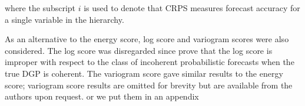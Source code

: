 \documentclass[graybox]{svmult}
\begin{document}
where the subscript $i$ is used to denote that CRPS measures forecast accuracy for a single variable in the hierarchy.

As an alternative to the energy score, log score and variogram scores were also considered.  The log score was disregarded since \cite{Gamakumara2018} prove that the log score is improper with respect to the class of incoherent probabilistic forecasts when the true DGP is coherent.  The variogram score gave similar results to the energy score; variogram score results are omitted for brevity but are available from the authors upon request. {\color{red} or we put them in an appendix}


%
%
%
%
%
%
%
\end{document}
